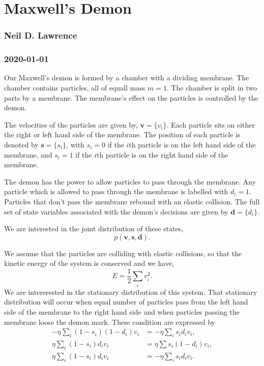 \documentclass[
]{article}
\author{}
\date{}
\begin{document}
\hypertarget{maxwells-demon}{%
\section{Maxwell's Demon}\label{maxwells-demon}}

\hypertarget{neil-d-lawrence}{%
\subsubsection{Neil D. Lawrence}\label{neil-d-lawrence}}

\hypertarget{2020-01-01}{%
\subsubsection{2020-01-01}\label{2020-01-01}}

Our Maxwell's demon is formed by a chamber with a dividing membrane. The
chamber contains particles, all of equall mass \(m=1\). The chamber is
split in two parts by a membrane. The membrane's effect on the particles
is controlled by the demon.

The velocities of the particles are given by, \(\mathbf{v} = \{ v_i\}\).
Each particle sits on either the right or left hand side of the
membrane. The position of each particle is denoted by
\(\mathbf{s} = \{ s_i \}\), with \(s_i=0\) if the \(i\)th particle is on
the left hand side of the membrane, and \(s_i = 1\) if the \(i\)th
particle is on the right hand side of the membrane.

The demon has the power to allow particles to pass through the membrane.
Any particle which is allowed to pass through the membrane is labelled
with \(d_i = 1\). Particles that don't pass the membrane rebound with an
elastic collision. The full set of state variables associated with the
demon's decisions are given by \(\mathbf{d} = \{ d_i \}\).

We are interested in the joint distribution of these states, \[
p(\mathbf{v}, \mathbf{s}, \mathbf{d}).
\]

We assume that the particles are colliding with elastic collisions, so
that the kinetic energy of the system is conserved and we have, \[
E = \frac{1}{2}\sum_{i}v_i^2.
\] We are intererested in the stationary distribution of this system.
That stationary distribution will occur when equal number of particles
pass from the left hand side of the membrane to the right hand side and
when particles passing the membrane loose the demon mark. These
condition are expressed by \[\begin{align*}
-\eta\sum_{i} (1-s_i)(1-d_i) v_i & = -\eta\sum_{i} s_i d_i v_i,\\
\eta\sum_{i} (1-s_i) d_i v_i & = \eta\sum s_i(1- d_i) v_i,\\
\eta\sum_{i} (1-s_i) d_i v_i & = -\eta\sum_{i} s_i d_i v_i.
\end{align*}\]
\end{document}
